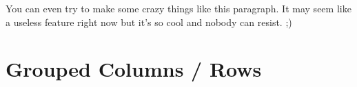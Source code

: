 \documentclass[table]{article}
\begin{document}
\bgroup\fontsize{5}{7}\selectfont \textcolor[HTML]{440154}{You}\egroup{} \bgroup\fontsize{6}{8}\selectfont \textcolor[HTML]{470D60}{can}\egroup{} \bgroup\fontsize{6}{8}\selectfont \textcolor[HTML]{48186A}{even}\egroup{} \bgroup\fontsize{7}{9}\selectfont \textcolor[HTML]{482274}{try}\egroup{} \bgroup\fontsize{7}{9}\selectfont \textcolor[HTML]{472D7A}{to}\egroup{} \bgroup\fontsize{8}{10}\selectfont \textcolor[HTML]{453681}{make}\egroup{} \bgroup\fontsize{8}{10}\selectfont \textcolor[HTML]{424086}{some}\egroup{} \bgroup\fontsize{9}{11}\selectfont \textcolor[HTML]{3E4989}{crazy}\egroup{} \bgroup\fontsize{9}{11}\selectfont \textcolor[HTML]{3B518B}{things}\egroup{} \bgroup\fontsize{10}{12}\selectfont \textcolor[HTML]{375A8C}{like}\egroup{} \bgroup\fontsize{10}{12}\selectfont \textcolor[HTML]{33628D}{this}\egroup{} \bgroup\fontsize{11}{13}\selectfont \textcolor[HTML]{306A8E}{paragraph.}\egroup{} \bgroup\fontsize{11}{13}\selectfont \textcolor[HTML]{2C718E}{It}\egroup{} \bgroup\fontsize{12}{14}\selectfont \textcolor[HTML]{29798E}{may}\egroup{} \bgroup\fontsize{12}{14}\selectfont \textcolor[HTML]{26818E}{seem}\egroup{} \bgroup\fontsize{13}{15}\selectfont \textcolor[HTML]{23888E}{like}\egroup{} \bgroup\fontsize{13}{15}\selectfont \textcolor[HTML]{21908D}{a}\egroup{} \bgroup\fontsize{14}{16}\selectfont \textcolor[HTML]{1F968B}{useless}\egroup{} \bgroup\fontsize{14}{16}\selectfont \textcolor[HTML]{1F9E89}{feature}\egroup{} \bgroup\fontsize{15}{17}\selectfont \textcolor[HTML]{21A585}{right}\egroup{} \bgroup\fontsize{15}{17}\selectfont \textcolor[HTML]{26AD81}{now}\egroup{} \bgroup\fontsize{16}{18}\selectfont \textcolor[HTML]{30B47C}{but}\egroup{} \bgroup\fontsize{16}{18}\selectfont \textcolor[HTML]{3BBB75}{it's}\egroup{} \bgroup\fontsize{17}{19}\selectfont \textcolor[HTML]{4AC16D}{so}\egroup{} \bgroup\fontsize{17}{19}\selectfont \textcolor[HTML]{5AC864}{cool}\egroup{} \bgroup\fontsize{18}{20}\selectfont \textcolor[HTML]{6CCD5A}{and}\egroup{} \bgroup\fontsize{18}{20}\selectfont \textcolor[HTML]{7FD34E}{nobody}\egroup{} \bgroup\fontsize{19}{21}\selectfont \textcolor[HTML]{91D742}{can}\egroup{} \bgroup\fontsize{19}{21}\selectfont \textcolor[HTML]{A6DB35}{resist.}\egroup{} \bgroup\fontsize{20}{22}\selectfont \textcolor[HTML]{BBDF27}{;)}\egroup{}

\hypertarget{grouped-columns-rows}{%
\section{Grouped Columns / Rows}\label{grouped-columns-rows}}
\end{document}
